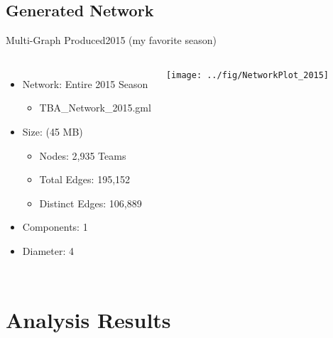 \documentclass[10pt]{beamer}
\begin{document}
\subsection{Generated Network}
\begin{frame}{Multi-Graph Produced}{2015 (my favorite season)}
	\begin{columns}
			
			
			
			\begin{itemize}
				\item Network: Entire 2015 Season
				\begin{itemize}
					\item TBA\_Network\_2015.gml
				\end{itemize} 
				\item Size: (45 MB)
				\begin{itemize}
					\item Nodes: 2,935 Teams
					\item Total Edges: 195,152
					\item Distinct Edges: 106,889
				\end{itemize}
				\item Components: 1
				\item Diameter: 4
			\end{itemize}
		\texttt{[image: ../fig/NetworkPlot\_2015]}
	\end{columns}
\end{frame}


\section{Analysis Results}
\end{document}
